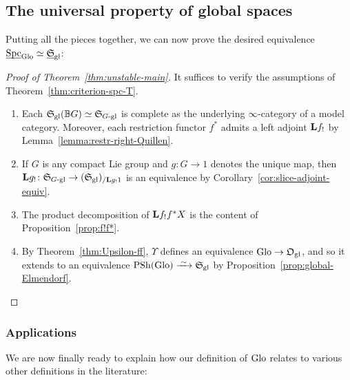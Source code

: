 \documentclass[reqno]{memo-l}
\theoremstyle{mythm}
\theoremstyle{definition}
\numberwithin{equation}{section}
\newcommand{\gl}{\textup{gl}}
\DeclareMathOperator{\Spc}{Spc}
\DeclareMathOperator{\PSh}{PSh}
\newcommand{\cat}[1]{\textbf{\textup{#1}}}
\newcommand{\Glo}{\textup{Glo}}
\newcommand{\BGcat}[1]{\mathbb B{#1}}
\newcommand{\ulhelper}[2]{\underline{\setbox0=\hbox{$#1#2$}\dp0=0.4pt \box0\relax}}
\newcommand{\ul}[1]{{\mathpalette\ulhelper{#1}}\hbox{\rule[-2pt]{0pt}{0pt}}}
\newcommand{\iso}{\xrightarrow{\;\smash{\raisebox{-0.25ex}{\ensuremath{\scriptstyle\sim}}}\;}}
\newcommand{\myS}{{{\mathfrak S\kern-.4pt}}}
\begin{document}
\subsection{The universal property of global spaces}\label{subsec:proof-unstable-comp} Putting all the pieces together, we can now prove the desired equivalence $\ul\Spc_\Glo\simeq\ul\myS_\gl$:

\begin{proof}[Proof of Theorem~\ref{thm:unstable-main}]
    It suffices to verify the assumptions of Theorem~\ref{thm:criterion-spc-T}.
    \begin{enumerate}
        \item Each $\myS_\gl(\BGcat{G})\simeq\myS_\text{$G$-gl}$ is complete as the underlying $\infty$-category of a model category. Moreover, each restriction functor $f^*$ admits a left adjoint $\cat{L}f_!$ by Lemma~\ref{lemma:restr-right-Quillen}.
        \item If $G$ is any compact Lie group and $g\colon G\to 1$ denotes the unique map, then $\cat{L}g_!\colon\myS_\text{$G$-gl}\to(\myS_\gl)_{/\cat{L}g_!1}$ is an equivalence by Corollary~\ref{cor:slice-adjoint-equiv}.
        \item The product decomposition of $\cat{L}f_!f^*X$ is the content of Proposition~\ref{prop:f!f*}.
        \item By Theorem~\ref{thm:Upsilon-ff}, $\Upsilon$ defines an equivalence $\Glo\to\mathfrak O_\gl$, and so it extends to an equivalence $\PSh(\Glo)\iso\myS_\gl$ by Proposition~\ref{prop:global-Elmendorf}.
        \qedhere
    \end{enumerate}
\end{proof}

\subsubsection{Applications} We are now finally ready to explain how our definition of $\Glo$ relates to various other definitions in the literature:
\end{document}
